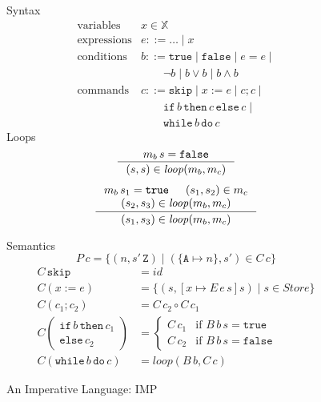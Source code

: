 \documentclass{tufte-handout}
\newcommand{\ASSIGN}[2]{#1 \mathrel{:=} #2}
\newcommand{\SEQ}[2]{#1 \mathrel{;} #2}
\newcommand{\SKIP}[0]{\mathtt{skip}}
\newcommand{\IF}[3]{\mathtt{if}\,#1\,\mathtt{then}\,#2\,\mathtt{else}\,#3}
\newcommand{\WHILE}[2]{\mathtt{while}\,#1\,\mathtt{do}\,#2}
\newcommand{\TRUE}[0]{\mathtt{true}}
\newcommand{\FALSE}[0]{\mathtt{false}}
\begin{document}
\begin{figure*}[btp]
\begin{minipage}{0.5\textwidth}
\noindent Syntax
\[
\begin{array}{ll}
  \text{variables} & x \in \mathbb{X}  \\
 \text{expressions} & e ::= \ldots \mid x \\
 \text{conditions} & b  ::= \TRUE \mid \FALSE \mid e = e \mid \\
  &   \qquad \neg b \mid b \lor b \mid b \land b \\
 \text{commands}& c ::= \SKIP \mid \ASSIGN{x}{e} \mid \SEQ{c}{c} \mid\\
  &      \qquad \IF{b}{c}{c} \mid \\
  &      \qquad \WHILE{b}{c} 
\end{array}
\]
Loops
\begin{gather*}
  \inference{m_b\,s = \FALSE}
            {(s,s) \in \mathit{loop}(m_b, m_c)}
\\[1ex]
  \inference{m_b\,s_1 = \TRUE & 
             (s_1,s_2) \in m_c \\
             (s_2, s_3) \in \mathit{loop}(m_b, m_c)}
            {(s_1, s_3) \in \mathit{loop}(m_b, m_c)}
\end{gather*}
\end{minipage}
\begin{minipage}{0.5\textwidth}
Semantics 
\[
P\,c = \{ (n,s'\,\mathtt{Z}) \mid (\{\mathtt{A}{\mapsto} n\},s') \in C\,c \}
\]
\begin{align*}
C\,\SKIP &= \mathit{id} \\ %
C(\ASSIGN{x}{e}) &= \{ (s,[x\mapsto E\,e\,s]s) \mid s {\in} \mathit{Store} \}\\
C(\SEQ{c_1}{c_2}) &=  C\,c_2 \circ C\,c_1 \\
C\left(\!\!\begin{array}{l}
  \mathtt{if}\,b\,\mathtt{then}\,c_1\\
  \mathtt{else}\,c_2
  \end{array}\!\!\right)
  &= 
 \begin{cases}
  C\,c_1 & \text{if } B\,b\,s = \TRUE \\
  C\,c_2 & \text{if } B\,b\,s = \FALSE
 \end{cases} \\
C(\WHILE{b}{c}) &= \mathit{loop}(B\,b, C\,c)
\end{align*}
\end{minipage}
\caption{An Imperative Language: IMP}
\label{fig:imperative}
\end{figure*}
\end{document}
